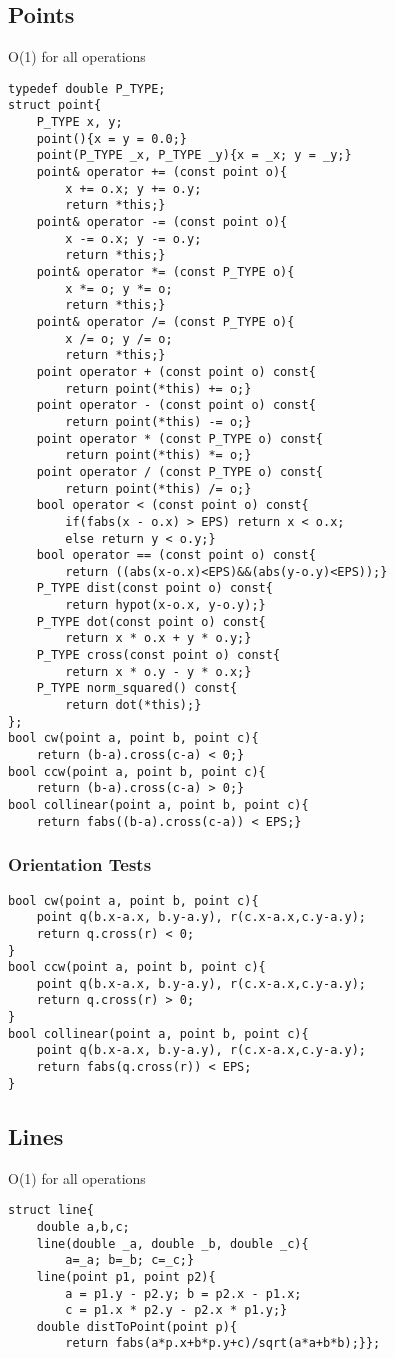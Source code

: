 \documentclass[10pt]{article}{\twocolumn}
\begin{document}
\subsection{Points}
O(1) for all operations
\begin{lstlisting}
typedef double P_TYPE;
struct point{
    P_TYPE x, y;
    point(){x = y = 0.0;}
    point(P_TYPE _x, P_TYPE _y){x = _x; y = _y;}
    point& operator += (const point o){
        x += o.x; y += o.y;
        return *this;}
    point& operator -= (const point o){
        x -= o.x; y -= o.y;
        return *this;}
    point& operator *= (const P_TYPE o){
        x *= o; y *= o;
        return *this;}
    point& operator /= (const P_TYPE o){
        x /= o; y /= o;
        return *this;}
    point operator + (const point o) const{
        return point(*this) += o;}
    point operator - (const point o) const{
        return point(*this) -= o;}
    point operator * (const P_TYPE o) const{
        return point(*this) *= o;}
    point operator / (const P_TYPE o) const{
        return point(*this) /= o;}
    bool operator < (const point o) const{
        if(fabs(x - o.x) > EPS) return x < o.x;
        else return y < o.y;}
    bool operator == (const point o) const{
        return ((abs(x-o.x)<EPS)&&(abs(y-o.y)<EPS));}
    P_TYPE dist(const point o) const{
        return hypot(x-o.x, y-o.y);}
    P_TYPE dot(const point o) const{
        return x * o.x + y * o.y;}
    P_TYPE cross(const point o) const{
        return x * o.y - y * o.x;}
    P_TYPE norm_squared() const{
        return dot(*this);}
};
bool cw(point a, point b, point c){
    return (b-a).cross(c-a) < 0;}
bool ccw(point a, point b, point c){
    return (b-a).cross(c-a) > 0;}
bool collinear(point a, point b, point c){
    return fabs((b-a).cross(c-a)) < EPS;}
\end{lstlisting}
\subsubsection{Orientation Tests}
\begin{lstlisting}
bool cw(point a, point b, point c){
    point q(b.x-a.x, b.y-a.y), r(c.x-a.x,c.y-a.y);
    return q.cross(r) < 0;
}
bool ccw(point a, point b, point c){
    point q(b.x-a.x, b.y-a.y), r(c.x-a.x,c.y-a.y);
    return q.cross(r) > 0;
}
bool collinear(point a, point b, point c){
    point q(b.x-a.x, b.y-a.y), r(c.x-a.x,c.y-a.y);
    return fabs(q.cross(r)) < EPS;
}
\end{lstlisting}
\subsection{Lines}
O(1) for all operations
\begin{lstlisting}
struct line{
    double a,b,c;
    line(double _a, double _b, double _c){
        a=_a; b=_b; c=_c;}
    line(point p1, point p2){
        a = p1.y - p2.y; b = p2.x - p1.x;
        c = p1.x * p2.y - p2.x * p1.y;}
    double distToPoint(point p){
        return fabs(a*p.x+b*p.y+c)/sqrt(a*a+b*b);}};
\end{lstlisting}
\end{document}
